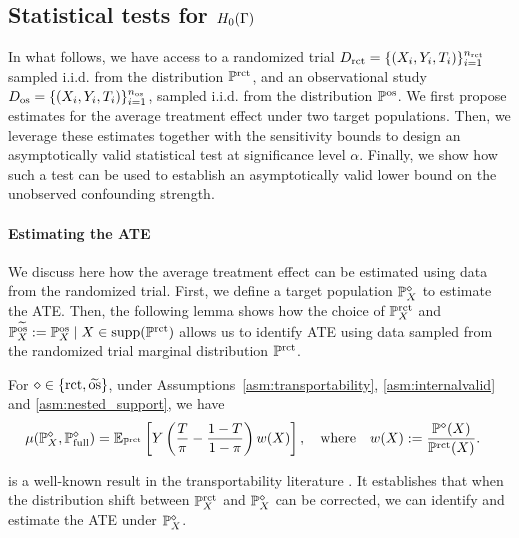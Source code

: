 \subsection{Statistical tests for $H_0(\Gamma)$}
In what follows, we have access to a randomized trial $D_{\operatorname{rct}} = \{(X_i,Y_i,T_i)\}_{i=1}^{n_{\operatorname{rct}}}$ sampled i.i.d. from the distribution $\mathbb{P}^{\operatorname{rct}}$, and an observational study $D_{\mathrm{os}} = \{(X_i,Y_i,T_i)\}_{i=1}^{n_{\operatorname{os}}}$, sampled i.i.d. from the distribution $\mathbb{P}^{\operatorname{os}}$. We first propose estimates for the average treatment effect under two target populations. Then, we leverage these estimates together with the sensitivity bounds to design an asymptotically valid statistical test at significance level $\alpha$. Finally, we show how such a test can be used to establish an asymptotically valid lower bound on the unobserved confounding strength. 

\label{sec:test_presentetion}

\paragraph{Estimating the ATE} We discuss here how the average treatment effect can be estimated using data from the randomized trial. First, we define a target population $\mathbb{P} ^{\diamond}_X$ to estimate the ATE. 
Then, the following lemma shows how the choice of $\mathbb{P}^{\operatorname{rct}}_X$ and $\mathbb{P}^{\widetilde{\mathrm{os}}}_X := \mathbb{P}^{\operatorname{os}}_X \mid X \in {\operatorname{supp}}(\mathbb{P}^{\operatorname{rct}})$ allows us to identify ATE  using data sampled from the randomized trial marginal distribution $\mathbb{P}^{\operatorname{rct}}$.


\begin{lemma}
\label{lemma:identify_ate}
For $\diamond \in \{ \mathrm{rct}, \widetilde{\mathrm{os}}\}$, under Assumptions~\ref{asm:transportability}, \ref{asm:internalvalid} and     
\ref{asm:nested_support}, we have
\begin{align*}
\mu(\mathbb{P} ^{\diamond}_X, \mathbb{P} ^{\diamond}_{\operatorname{full}}) &= \mathbb{E}_{\mathbb{P}^{\operatorname{rct}}} \left[ Y\left(\frac{T}{\pi} - \frac{1-T}{1-\pi}  \right)  w(X) \right], \quad \mathrm{where}\quad   w(X) := \frac{\mathbb{P} ^{\diamond}(X)}{\mathbb{P}^{\operatorname{rct}}(X)}.
\end{align*}
\end{lemma}
 is a well-known result in the transportability literature  \citep{cole2010generalizing,colnet2023risk}. It establishes that when the distribution shift between $\mathbb{P}^{\operatorname{rct}}_X$ and $\mathbb{P} ^{\diamond}_X$ can be corrected, we can identify and estimate the ATE under $\mathbb{P} ^{\diamond}_X$. 

